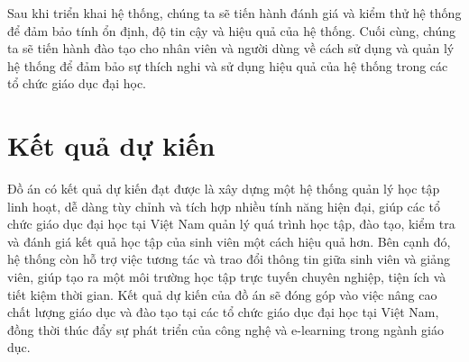 \documentclass[../Thesis.tex]{subfiles}
\begin{document}
Sau khi triển khai hệ thống, chúng ta sẽ tiến hành đánh giá và kiểm thử hệ thống để đảm bảo tính ổn định, độ tin cậy và hiệu quả của hệ thống. Cuối cùng, chúng ta sẽ tiến hành đào tạo cho nhân viên và người dùng về cách sử dụng và quản lý hệ thống để đảm bảo sự thích nghi và sử dụng hiệu quả của hệ thống trong các tổ chức giáo dục đại học.

\section{Kết quả dự kiến}

Đồ án có kết quả dự kiến đạt được là xây dựng một hệ thống quản lý học tập linh hoạt, dễ dàng tùy chỉnh và tích hợp nhiều tính năng hiện đại, giúp các tổ chức giáo dục đại học tại Việt Nam quản lý quá trình học tập, đào tạo, kiểm tra và đánh giá kết quả học tập của sinh viên một cách hiệu quả hơn. Bên cạnh đó, hệ thống còn hỗ trợ việc tương tác và trao đổi thông tin giữa sinh viên và giảng viên, giúp tạo ra một môi trường học tập trực tuyến chuyên nghiệp, tiện ích và tiết kiệm thời gian. Kết quả dự kiến của đồ án sẽ đóng góp vào việc nâng cao chất lượng giáo dục và đào tạo tại các tổ chức giáo dục đại học tại Việt Nam, đồng thời thúc đẩy sự phát triển của công nghệ và e-learning trong ngành giáo dục.
\end{document}

